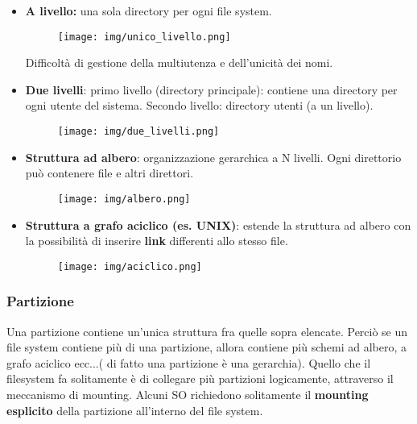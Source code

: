 \documentclass{article}
\begin{document}
\begin{itemize}
    \item  \noindent \textbf{A livello:} una sola directory per
ogni file system.

\begin{figure}[h!]
    \begin{center}
        \texttt{[image: img/unico\_livello.png]}      
    \end{center}
\end{figure}

    Difficoltà di gestione della multiutenza e dell'unicità 
    dei nomi.
    \item \textbf{Due livelli}: primo livello (directory principale): contiene una
        directory per ogni utente del sistema. Secondo livello:
        directory utenti (a un livello).
        \begin{figure}[h!]
            \begin{center}
                \texttt{[image: img/due\_livelli.png]}      
            \end{center}
        \end{figure}
    \item \textbf{Struttura ad albero}: organizzazione gerarchica 
    a N livelli. Ogni direttorio può contenere file e altri direttori.

    \begin{figure}[h!]
        \begin{center}
            \texttt{[image: img/albero.png]}      
        \end{center}
    \end{figure}
\pagebreak
    \item \textbf{Struttura a grafo aciclico (es. UNIX)}: 
    estende la struttura ad albero con la possibilità di
    inserire \textbf{link} differenti allo stesso file.

    \begin{figure}[h!]
        \begin{center}
            \texttt{[image: img/aciclico.png]}      
        \end{center}
    \end{figure}
\end{itemize}

\subsubsection{Partizione}
Una partizione contiene un'unica struttura fra quelle sopra elencate.
Perciò se un file system contiene più di una partizione, allora 
contiene più schemi ad albero, a grafo aciclico ecc...( di fatto una
partizione è una gerarchia).
Quello che il filesystem fa solitamente è di collegare più partizioni
 logicamente, attraverso il meccanismo di mounting. Alcuni SO 
 richiedono solitamente il \textbf{mounting esplicito} della partizione
 all'interno del file system.
\end{document}
